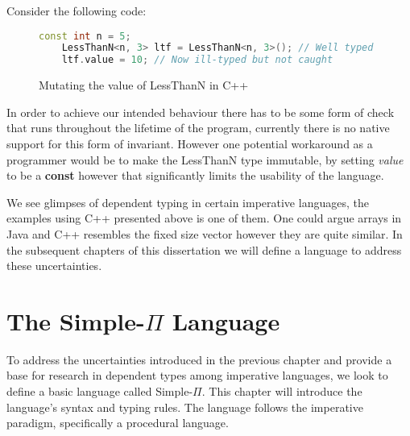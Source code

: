 \documentclass[a4paper,12pt]{report}
\begin{document}
\par
Consider the following code: 
\begin{figure}[H]
  \begin{lstlisting}[language=c++]     
    const int n = 5;
    LessThanN<n, 3> ltf = LessThanN<n, 3>(); // Well typed
    ltf.value = 10; // Now ill-typed but not caught
  \end{lstlisting}
  \caption{Mutating the value of LessThanN in C++}
\end{figure}

\par
In order to achieve our intended behaviour there has to be some form of check 
that runs throughout the lifetime of the program, currently there is no native 
support for this form of invariant. However one potential workaround as a 
programmer would be to make the LessThanN type immutable, by setting \textit{value} 
to be a \textbf{const} however that significantly limits the usability of the 
language. 

\par
We see glimpses of dependent typing in certain imperative languages, the 
examples using C++ presented above is one of them. One could argue arrays in 
Java and C++ resembles the fixed size vector however they are quite similar. In 
the subsequent chapters of this dissertation we will define a language to 
address these uncertainties. 

\chapter{The Simple-$\Pi$ Language}
To address the uncertainties introduced in the previous chapter and provide a 
base for research in dependent types among imperative languages, we look to 
define a basic language called Simple-$\Pi$. This chapter will introduce 
the language's syntax and typing rules. The language follows 
the imperative paradigm, specifically a procedural language.
\end{document}
